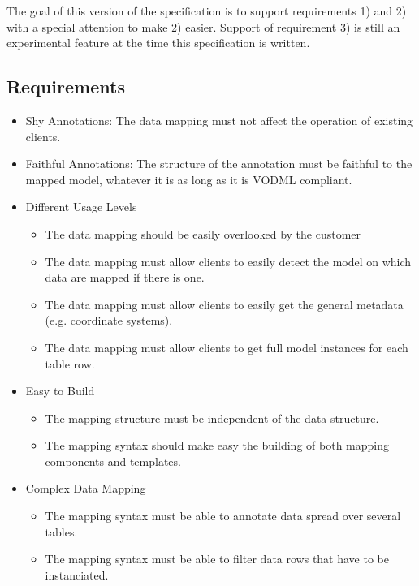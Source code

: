 \documentclass[11pt,a4paper]{ivoa}
\begin{document}
The goal of this version of the specification is to support requirements 1) and 2) with a special attention to make 2) easier. 
Support of requirement 3) is still an experimental feature at the time this specification is written.


\subsection{Requirements}

\begin{itemize}
\item Shy Annotations: The data mapping must not affect the operation of existing clients.

\item Faithful Annotations: The structure of the annotation must be faithful to the mapped model, whatever it is as long as it is VODML compliant. 


\item Different Usage Levels 
\begin{itemize}
   \item The data mapping should be easily overlooked by the customer
   \item The data mapping must allow clients to easily detect the model on which data are mapped if there is one.
   \item The data mapping must allow clients to easily get the general metadata (e.g. coordinate systems).
   \item The data mapping must allow clients to get full model instances for each table row.
\end{itemize}

\item Easy to Build 
\begin{itemize}
   \item The mapping structure must be independent of the data structure.
   \item The mapping syntax should make easy the building of both mapping components and templates.
\end{itemize}

\item Complex Data Mapping 
\begin{itemize}
   \item The mapping syntax must be able to annotate data spread over several tables.
   \item The mapping syntax must be able to filter data rows that have to be instanciated.
\end{itemize}
\end{itemize}
\end{document}
